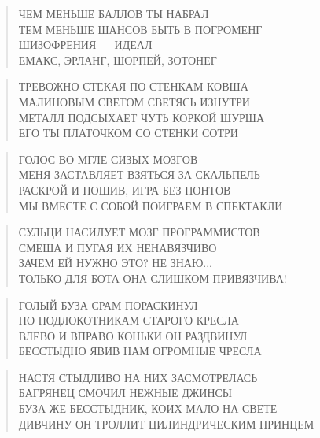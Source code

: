 \poemtitle{***}
\begin{verse}
ЧЕМ МЕНЬШЕ БАЛЛОВ ТЫ НАБРАЛ\\
ТЕМ МЕНЬШЕ ШАНСОВ БЫТЬ В ПОГРОМЕНГ\\
ШИЗОФРЕНИЯ — ИДЕАЛ\\
ЕМАКС, ЭРЛАНГ, ШОРПЕЙ, ЗОТОНЕГ
\end{verse}

\poemtitle{***}
\begin{verse}
ТРЕВОЖНО СТЕКАЯ ПО СТЕНКАМ КОВША\\
МАЛИНОВЫМ СВЕТОМ СВЕТЯСЬ ИЗНУТРИ\\
МЕТАЛЛ ПОДСЫХАЕТ ЧУТЬ КОРКОЙ ШУРША\\
ЕГО ТЫ ПЛАТОЧКОМ СО СТЕНКИ СОТРИ
\end{verse}

\poemtitle{***}
\begin{verse}
ГОЛОС ВО МГЛЕ СИЗЫХ МОЗГОВ\\
МЕНЯ ЗАСТАВЛЯЕТ ВЗЯТЬСЯ ЗА СКАЛЬПЕЛЬ\\
РАСКРОЙ И ПОШИВ, ИГРА БЕЗ ПОНТОВ\\
МЫ ВМЕСТЕ С СОБОЙ ПОИГРАЕМ В СПЕКТАКЛИ
\end{verse}

\poemtitle{***}
\begin{verse}
СУЛЬЦИ НАСИЛУЕТ МОЗГ ПРОГРАММИСТОВ\\
СМЕША И ПУГАЯ ИХ НЕНАВЯЗЧИВО\\
ЗАЧЕМ ЕЙ НУЖНО ЭТО? НЕ ЗНАЮ...\\
ТОЛЬКО ДЛЯ БОТА ОНА СЛИШКОМ ПРИВЯЗЧИВА!
\end{verse}

\poemtitle{***}
\begin{verse}
ГОЛЫЙ БУЗА СРАМ ПОРАСКИНУЛ\\
ПО ПОДЛОКОТНИКАМ СТАРОГО КРЕСЛА\\
ВЛЕВО И ВПРАВО КОНЬКИ ОН РАЗДВИНУЛ\\
БЕССТЫДНО ЯВИВ НАМ ОГРОМНЫЕ ЧРЕСЛА
\end{verse}

\poemtitle{***}
\begin{verse}
НАСТЯ СТЫДЛИВО НА НИХ ЗАСМОТРЕЛАСЬ\\
БАГРЯНЕЦ СМОЧИЛ НЕЖНЫЕ ДЖИНСЫ\\
БУЗА ЖЕ БЕССТЫДНИК, КОИХ МАЛО НА СВЕТЕ\\
ДИВЧИНУ ОН ТРОЛЛИТ ЦИЛИНДРИЧЕСКИМ ПРИНЦЕМ
\end{verse}

